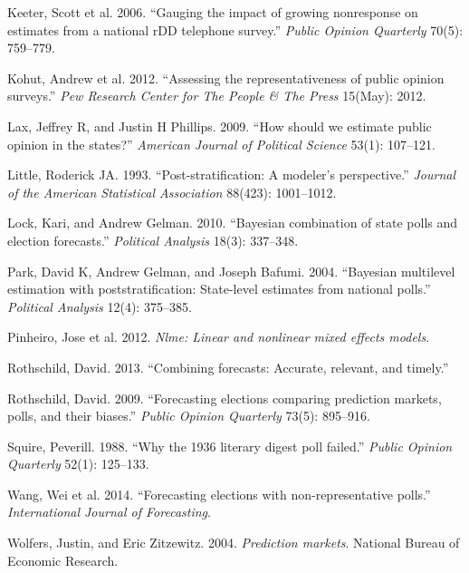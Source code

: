 Keeter, Scott et al. 2006. ``Gauging the impact of growing nonresponse
on estimates from a national rDD telephone survey.'' \emph{Public
Opinion Quarterly} 70(5): 759--779.

Kohut, Andrew et al. 2012. ``Assessing the representativeness of public
opinion surveys.'' \emph{Pew Research Center for The People \& The
Press} 15(May): 2012.

Lax, Jeffrey R, and Justin H Phillips. 2009. ``How should we estimate
public opinion in the states?'' \emph{American Journal of Political
Science} 53(1): 107--121.

Little, Roderick JA. 1993. ``Post-stratification: A modeler's
perspective.'' \emph{Journal of the American Statistical Association}
88(423): 1001--1012.

Lock, Kari, and Andrew Gelman. 2010. ``Bayesian combination of state
polls and election forecasts.'' \emph{Political Analysis} 18(3):
337--348.

Park, David K, Andrew Gelman, and Joseph Bafumi. 2004. ``Bayesian
multilevel estimation with poststratification: State-level estimates
from national polls.'' \emph{Political Analysis} 12(4): 375--385.

Pinheiro, Jose et al. 2012. \emph{Nlme: Linear and nonlinear mixed
effects models}.

Rothschild, David. 2013. ``Combining forecasts: Accurate, relevant, and
timely.''

Rothschild, David. 2009. ``Forecasting elections comparing prediction
markets, polls, and their biases.'' \emph{Public Opinion Quarterly}
73(5): 895--916.

Squire, Peverill. 1988. ``Why the 1936 literary digest poll failed.''
\emph{Public Opinion Quarterly} 52(1): 125--133.

Wang, Wei et al. 2014. ``Forecasting elections with non-representative
polls.'' \emph{International Journal of Forecasting}.

Wolfers, Justin, and Eric Zitzewitz. 2004. \emph{Prediction markets}.
National Bureau of Economic Research.
